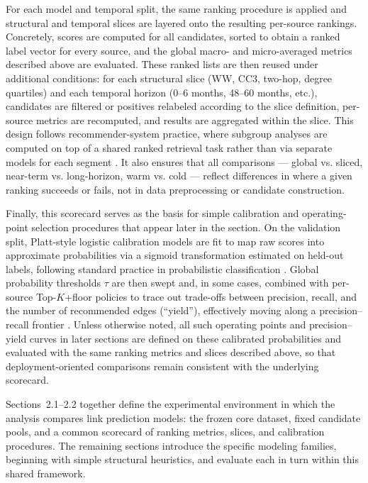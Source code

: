 For each model and temporal split, the same ranking procedure is applied and structural and temporal slices are layered onto the resulting per-source rankings. Concretely, scores are computed for all candidates, sorted to obtain a ranked label vector for every source, and the global macro- and micro-averaged metrics described above are evaluated. These ranked lists are then reused under additional conditions: for each structural slice (WW, CC3, two-hop, degree quartiles) and each temporal horizon (0--6 months, 48--60 months, etc.), candidates are filtered or positives relabeled according to the slice definition, per-source metrics are recomputed, and results are aggregated within the slice. This design follows recommender-system practice, where subgroup analyses are computed on top of a shared ranked retrieval task rather than via separate models for each segment \parencite{herlocker_evaluating_2004,shani_evaluating_2011}. It also ensures that all comparisons --- global vs. sliced, near-term vs. long-horizon, warm vs. cold --- reflect differences in where a given ranking succeeds or fails, not in data preprocessing or candidate construction.

Finally, this scorecard serves as the basis for simple calibration and operating-point selection procedures that appear later in the section. On the validation split, Platt-style logistic calibration models are fit to map raw scores into approximate probabilities via a sigmoid transformation estimated on held-out labels, following standard practice in probabilistic classification \parencite{platt_probabilistic_1999,niculescu-mizil_predicting_2005}. Global probability thresholds $\tau$ are then swept and, in some cases, combined with per-source Top-$K$+floor policies to trace out trade-offs between precision, recall, and the number of recommended edges (``yield''), effectively moving along a precision--recall frontier \parencite{davis_relationship_2006,saito_precision-recall_2015}. Unless otherwise noted, all such operating points and precision--yield curves in later sections are defined on these calibrated probabilities and evaluated with the same ranking metrics and slices described above, so that deployment-oriented comparisons remain consistent with the underlying scorecard.

Sections~2.1--2.2 together define the experimental environment in which the analysis compares link prediction models: the frozen core dataset, fixed candidate pools, and a common scorecard of ranking metrics, slices, and calibration procedures. The remaining sections introduce the specific modeling families, beginning with simple structural heuristics, and evaluate each in turn within this shared framework.

